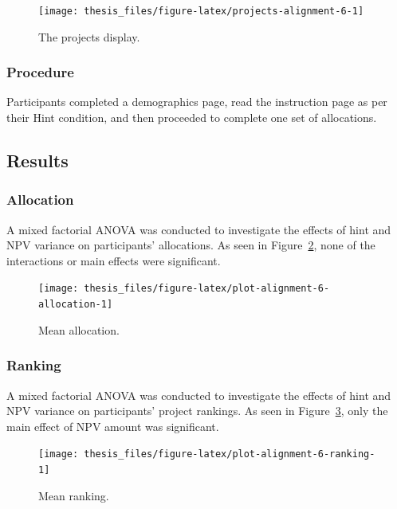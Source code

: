 \documentclass[a4paper, nobind, dvipsnames]{templates/ociamthesis}
\theoremstyle{definition}
\theoremstyle{definition}
\theoremstyle{definition}
\theoremstyle{definition}
\theoremstyle{remark}
\begin{document}
\begin{figure}
\texttt{[image: thesis\_files/figure-latex/projects-alignment-6-1]} \caption{The projects display.}\label{fig:projects-alignment-6}
\end{figure}

\hypertarget{procedure-11}{%
\subsubsection{Procedure}\label{procedure-11}}

Participants completed a demographics page, read the instruction page as per
their Hint condition, and then proceeded to complete one set of allocations.

\hypertarget{results-9}{%
\subsection{Results}\label{results-9}}

\hypertarget{allocation-1}{%
\subsubsection{Allocation}\label{allocation-1}}

A mixed factorial ANOVA was conducted to investigate the effects of hint
and NPV variance on participants' allocations. As seen in
Figure~\ref{fig:plot-alignment-6-allocation}, none of the interactions or main
effects were significant.



\begin{figure}
\texttt{[image: thesis\_files/figure-latex/plot-alignment-6-allocation-1]} \caption{Mean allocation.}\label{fig:plot-alignment-6-allocation}
\end{figure}

\hypertarget{ranking-2}{%
\subsubsection{Ranking}\label{ranking-2}}

A mixed factorial ANOVA was conducted to investigate the effects of hint
and NPV variance on participants' project rankings. As seen in
Figure~\ref{fig:plot-alignment-6-ranking}, only the main effect of NPV amount
was significant.



\begin{figure}
\texttt{[image: thesis\_files/figure-latex/plot-alignment-6-ranking-1]} \caption{Mean ranking.}\label{fig:plot-alignment-6-ranking}
\end{figure}
\end{document}
